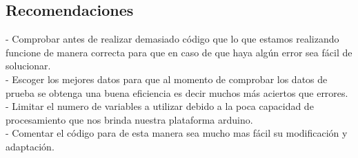 \documentclass[10pt,a4paper]{article}
\begin{document}
\subsection{Recomendaciones}
- Comprobar antes de realizar demasiado código que lo que estamos realizando funcione de manera correcta para que en caso de que haya algún error sea fácil de solucionar.\\
- Escoger los mejores datos para que al momento de comprobar los datos de prueba se obtenga una buena eficiencia es decir muchos más aciertos que errores.\\
- Limitar el numero de variables a utilizar debido a la poca capacidad de procesamiento que nos brinda nuestra plataforma arduino.\\
- Comentar el código para de esta manera sea mucho mas fácil su modificación y adaptación.\\
\end{document}

